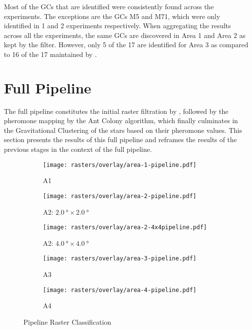 Most of the GCs that are identified were consistently found across the experiments. The exceptions are the GCs M5 and M71, which were only identified in 1 and 2 experiments respectively. When aggregating the results across all the experiments, the same GCs are discovered in Area 1 and Area 2 as kept by the \blobdog{} filter. However, only 5 of the 17 are identified for Area 3 as compared to 16 of the 17 maintained by \blobdog{}.

\newpage
\section{\label{sec:results-pipeline}Full Pipeline}
The full pipeline constitutes the initial raster filtration by \blobdog{}, followed by the pheromone mapping by the Ant Colony algorithm, which finally culminates in the Gravitational Clustering of the stars based on their pheromone values. This section presents the results of this full pipeline and reframes the results of the previous stages in the context of the full pipeline.
\begin{figure}[H]
    \centering
    \begin{subfigure}[b]{0.75\textwidth}
        \texttt{[image: rasters/overlay/area-1-pipeline.pdf]}
        \caption{\label{fig:pipeline-a1-overview}A1}
    \end{subfigure}

    \begin{subfigure}[b]{0.49\textwidth}
        \texttt{[image: rasters/overlay/area-2-pipeline.pdf]}
        \caption{\label{fig:pipeline-a2-overview}A2: $\SI{2.0}{\degree}\times\SI{2.0}{\degree}$}
    \end{subfigure}
    \begin{subfigure}[b]{0.49\textwidth}
        \texttt{[image: rasters/overlay/area-2-4x4pipeline.pdf]}
        \caption{\label{fig:pipeline-a2-4x4-overview}A2: $\SI{4.0}{\degree}\times\SI{4.0}{\degree}$}
    \end{subfigure}

    \begin{subfigure}[b]{0.49\textwidth}
        \texttt{[image: rasters/overlay/area-3-pipeline.pdf]}
        \caption{\label{fig:pipeline-a3-overview}A3}
    \end{subfigure}
    \begin{subfigure}[b]{0.49\textwidth}
        \texttt{[image: rasters/overlay/area-4-pipeline.pdf]}
        \caption{\label{fig:pipeline-a4-overview}A4}
    \end{subfigure}
    \caption{\label{fig:filtered-pipeline-rasters}Pipeline Raster Classification}
\end{figure}

